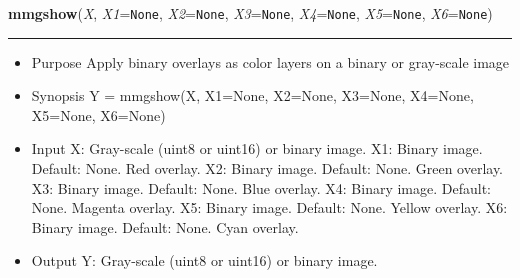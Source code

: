     \begin{boxedminipage}{\textwidth}

    \raggedright \textbf{mmgshow}(\textit{X}, \textit{X1}=\texttt{N\-o\-n\-e\-}, \textit{X2}=\texttt{N\-o\-n\-e\-}, \textit{X3}=\texttt{N\-o\-n\-e\-}, \textit{X4}=\texttt{N\-o\-n\-e\-}, \textit{X5}=\texttt{N\-o\-n\-e\-}, \textit{X6}=\texttt{N\-o\-n\-e\-})

    \vspace{-1.5ex}

    \rule{\textwidth}{0.5\fboxrule}
    \begin{itemize}
    \setlength{\parskip}{0.6ex}
      \item Purpose Apply binary overlays as color layers on a binary or 
        gray-scale image

      \item Synopsis Y = mmgshow(X, X1=None, X2=None, X3=None, X4=None, 
        X5=None, X6=None)

      \item Input X: Gray-scale (uint8 or uint16) or binary image. X1: Binary 
        image. Default: None. Red overlay. X2: Binary image. Default: 
        None. Green overlay. X3: Binary image. Default: None. Blue 
        overlay. X4: Binary image. Default: None. Magenta overlay. X5: 
        Binary image. Default: None. Yellow overlay. X6: Binary image. 
        Default: None. Cyan overlay.

      \item Output Y: Gray-scale (uint8 or uint16) or binary image.

    \end{itemize}

    \vspace{1ex}

    \end{boxedminipage}

    \label{multireg:num_pymorph:mmhistogram}
    \vspace{0.5ex}

